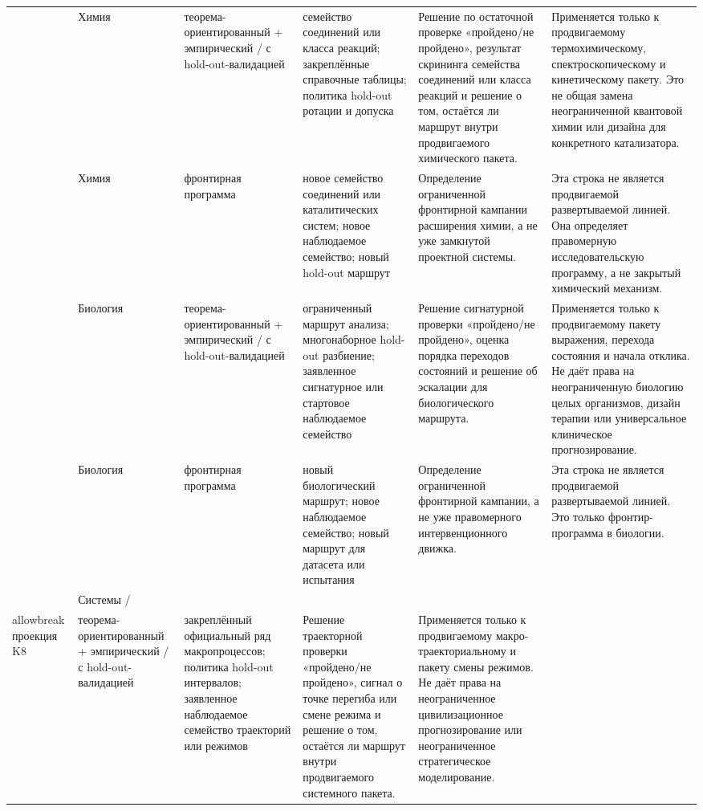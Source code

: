 \begin{longtable}{@{}L{0.13\textwidth}L{0.14\textwidth}L{0.12\textwidth}L{0.18\textwidth}L{0.17\textwidth}L{0.20\textwidth}@{}}
 & Химия & теорема-ориентированный + эмпирический / с hold-out-валидацией & семейство соединений или класса реакций; \allowbreak закреплённые справочные таблицы; \allowbreak политика hold-out ротации и допуска & Решение по остаточной проверке «пройдено/не пройдено», результат скрининга семейства соединений или класса реакций и решение о том, остаётся ли маршрут внутри продвигаемого химического пакета. & Применяется только к продвигаемому термохимическому, спектроскопическому и кинетическому пакету. Это не общая замена неограниченной квантовой химии или дизайна для конкретного катализатора. \\
 & Химия & фронтирная программа & новое семейство соединений или каталитических систем; \allowbreak новое наблюдаемое семейство; \allowbreak новый hold-out маршрут & Определение ограниченной фронтирной кампании расширения химии, а не уже замкнутой проектной системы. & Эта строка не является продвигаемой развертываемой линией. Она определяет правомерную исследовательскую программу, а не закрытый химический механизм. \\
 & Биология & теорема-ориентированный + эмпирический / с hold-out-валидацией & ограниченный маршрут анализа; \allowbreak многонаборное hold-out разбиение; \allowbreak заявленное сигнатурное или стартовое наблюдаемое семейство & Решение сигнатурной проверки «пройдено/не пройдено», оценка порядка переходов состояний и решение об эскалации для биологического маршрута. & Применяется только к продвигаемому пакету выражения, перехода состояния и начала отклика. Не даёт права на неограниченную биологию целых организмов, дизайн терапии или универсальное клиническое прогнозирование. \\
 & Биология & фронтирная программа & новый биологический маршрут; \allowbreak новое наблюдаемое семейство; \allowbreak новый маршрут для датасета или испытания & Определение ограниченной фронтирной кампании, а не уже правомерного интервенционного движка. & Эта строка не является продвигаемой развертываемой линией. Это только фронтир-программа в биологии. \\
 & Системы /\\allowbreak проекция K8 & теорема-ориентированный + эмпирический / с hold-out-валидацией & закреплённый официальный ряд макропроцессов; \allowbreak политика hold-out интервалов; \allowbreak заявленное наблюдаемое семейство траекторий или режимов & Решение траекторной проверки «пройдено/не пройдено», сигнал о точке перегиба или смене режима и решение о том, остаётся ли маршрут внутри продвигаемого системного пакета. & Применяется только к продвигаемому макро-траекториальному и пакету смены режимов. Не даёт права на неограниченное цивилизационное прогнозирование или неограниченное стратегическое моделирование. \\

\end{longtable}
